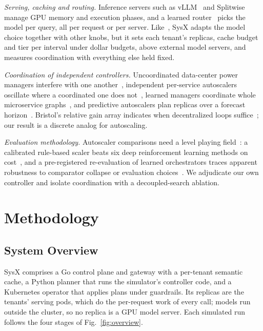 \documentclass[conference,a4paper]{IEEEtran}
\newcommand{\polyforge}{SysX}
\newcommand{\polyforge}{PolyForge}
\begin{document}
\textit{Serving, caching and routing.} Inference servers such as
vLLM~\cite{vllm} and Splitwise~\cite{splitwise} manage GPU memory and
execution phases, and a learned router~\cite{routellm} picks the model per
query, all per request or per server. Like~\cite{infaas,zhu2023},
\polyforge{} adapts the model choice together with other knobs, but it sets
each tenant's replicas, cache budget and tier per interval under dollar
budgets, above external model servers, and measures coordination with
everything else held fixed.

\textit{Coordination of independent controllers.} Uncoordinated data-center
power managers interfere with one another~\cite{nopowerstruggles},
independent per-service autoscalers oscillate where a coordinated one does
not~\cite{chamulteon}, learned managers coordinate whole microservice
graphs~\cite{sinan}, and predictive autoscalers plan replicas over a
forecast horizon~\cite{roy2011}. Bristol's relative gain array indicates when
decentralized loops suffice~\cite{bristol1966}; our result is a discrete
analog for autoscaling.

\textit{Evaluation methodology.} Autoscaler comparisons need a level playing
field~\cite{chameleon}: a calibrated rule-based scaler beats six deep
reinforcement learning methods on cost~\cite{zhang2026drl}, and a
pre-registered re-evaluation of learned orchestrators traces apparent
robustness to comparator collapse or evaluation choices~\cite{khilji2026}.
We adjudicate our own controller and isolate coordination with a
decoupled-search ablation.

\section{Methodology}
\label{sec:method}

\subsection{System Overview}
\label{sec:overview}

\polyforge{} comprises a Go control plane and gateway with a per-tenant
semantic cache, a Python planner that runs the simulator's controller code,
and a Kubernetes operator that applies plans under guardrails. Its replicas
are the tenants' serving pods, which do the per-request work of every call;
models run outside the cluster, so no replica is a GPU model server. Each
simulated run follows the four stages of Fig.~\ref{fig:overview}.
\suppressfloats[t]%
\end{document}
